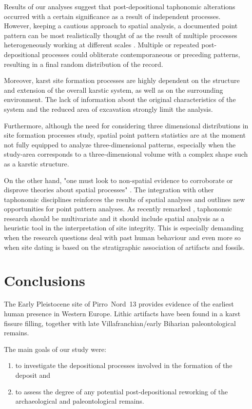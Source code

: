 \documentclass[review,authoryear]{elsarticle} %
\begin{document}
Results of our analyses suggest that post-depositional taphonomic alterations occurred with a certain significance as a result of independent processes. However, keeping a cautious approach to spatial analysis, a documented point pattern can be most realistically thought of as the result of multiple processes heterogeneously working at different scales \citep{Bevan2013}. Multiple or repeated post-depositional processes could obliterate contemporaneous or preceding patterns, resulting in a final random distribution of the record.

Moreover, karst site formation processes are highly dependent on the structure and extension of the overall karstic system, as well as on the surrounding environment. The lack of information about the original characteristics of the system and the reduced area of excavation strongly limit the analysis.

Furthermore, although the need for considering three dimensional distributions in site formation processes study, spatial point pattern statistics are at the moment not fully equipped to analyze three-dimensional patterns, especially when the study-area corresponds to a three-dimensional volume with a complex shape such as a karstic structure.

On the other hand, "one must look to non-spatial evidence to corroborate or disprove theories about spatial processes" \citep[p.~8]{Hodder1976}. The integration with other taphonomic disciplines reinforces the results of spatial analyses and outlines new opportunities for point pattern analyses. As recently remarked \citep{Cobo-Sanchez2014}, taphonomic research should be multivariate \citep{Dominguez-Rodrigo2010} and it should include spatial analysis as a heuristic tool in the interpretation of site integrity. This is especially demanding when the research questions deal with past human behaviour and even more so when site dating is based on the stratigraphic association of artifacts and fossils.

\section{Conclusions}

The Early Pleistocene site of Pirro~Nord~13 provides evidence of the earliest human presence in Western Europe. Lithic artifacts have been found in a karst fissure filling, together with late Villafranchian/early Biharian paleontological remains.

The main goals of our study were:
\begin{enumerate}
  \item to investigate the depositional processes involved in the formation of the deposit and
  \item to assess the degree of any potential post-depositional reworking of the archaeological and paleontological remains.
\end{enumerate}
\end{document}
